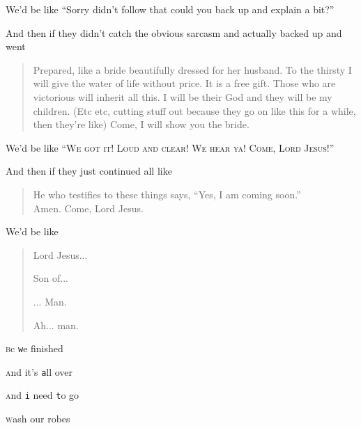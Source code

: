 {{                We'd be like ``Sorry didn't follow that could you back up and explain a bit?''

                And then if they didn't catch the obvious sarcasm and actually backed up and went

                \begin{quote}
                Prepared, like a bride beautifully dressed for her husband.
                To the thirsty I will give the water of life without price.
                It is a free gift.
                Those who are victorious will inherit all this.
                I will be their God and they will be my children.
                (Etc etc, cutting stuff out because they go on like this for a while, then they're like)
                Come, I will show you the bride.
                \end{quote}

                We'd be like ``\textsc{We got it! Loud and clear! We hear ya! Come, Lord Jesus!}''

                And then if they just continued all like

                \begin{quote}
                He who testifies to these things says, ``Yes, I am coming soon.''\\
                Amen. Come, Lord Jesus.
                \end{quote}

                We'd be like

                \begin{quote}
                \centering
                Lord Jesus...

                Son of...

                ... Man.

                Ah... man.
                \end{quote}

                \textsc{b}c \texttt{w}e finished

                \textsc{a}nd it's \texttt{a}ll over

                \textsc{a}nd \texttt{i} need \texttt{t}o go

                \textsc{w}ash our robes

                \begin{quote}
                \centering


\end{quote}}}
